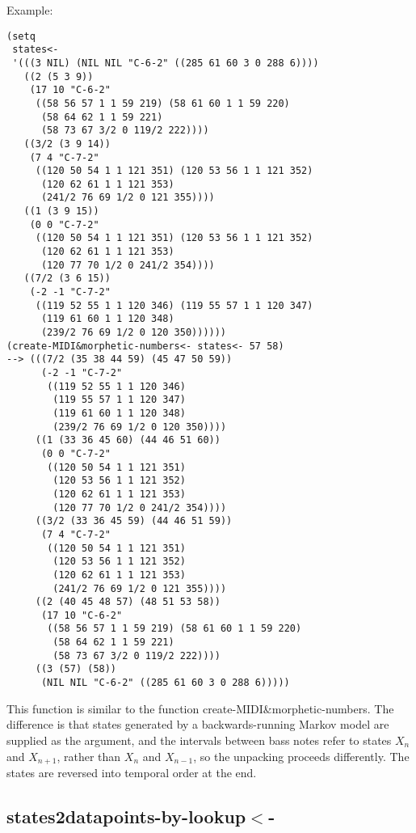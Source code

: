 \vspace{0.5cm}
\noindent Example:
\begin{verbatim}
(setq
 states<-
 '(((3 NIL) (NIL NIL "C-6-2" ((285 61 60 3 0 288 6))))
   ((2 (5 3 9))
    (17 10 "C-6-2"
     ((58 56 57 1 1 59 219) (58 61 60 1 1 59 220)
      (58 64 62 1 1 59 221)
      (58 73 67 3/2 0 119/2 222))))
   ((3/2 (3 9 14))
    (7 4 "C-7-2"
     ((120 50 54 1 1 121 351) (120 53 56 1 1 121 352)
      (120 62 61 1 1 121 353)
      (241/2 76 69 1/2 0 121 355))))
   ((1 (3 9 15))
    (0 0 "C-7-2"
     ((120 50 54 1 1 121 351) (120 53 56 1 1 121 352)
      (120 62 61 1 1 121 353)
      (120 77 70 1/2 0 241/2 354))))
   ((7/2 (3 6 15))
    (-2 -1 "C-7-2"
     ((119 52 55 1 1 120 346) (119 55 57 1 1 120 347)
      (119 61 60 1 1 120 348)
      (239/2 76 69 1/2 0 120 350))))))
(create-MIDI&morphetic-numbers<- states<- 57 58)
--> (((7/2 (35 38 44 59) (45 47 50 59))
      (-2 -1 "C-7-2"
       ((119 52 55 1 1 120 346)
        (119 55 57 1 1 120 347)
        (119 61 60 1 1 120 348)
        (239/2 76 69 1/2 0 120 350))))
     ((1 (33 36 45 60) (44 46 51 60))
      (0 0 "C-7-2"
       ((120 50 54 1 1 121 351)
        (120 53 56 1 1 121 352)
        (120 62 61 1 1 121 353)
        (120 77 70 1/2 0 241/2 354))))
     ((3/2 (33 36 45 59) (44 46 51 59))
      (7 4 "C-7-2"
       ((120 50 54 1 1 121 351)
        (120 53 56 1 1 121 352)
        (120 62 61 1 1 121 353)
        (241/2 76 69 1/2 0 121 355))))
     ((2 (40 45 48 57) (48 51 53 58))
      (17 10 "C-6-2"
       ((58 56 57 1 1 59 219) (58 61 60 1 1 59 220)
        (58 64 62 1 1 59 221)
        (58 73 67 3/2 0 119/2 222))))
     ((3 (57) (58))
      (NIL NIL "C-6-2" ((285 61 60 3 0 288 6)))))
\end{verbatim}

\noindent This function is similar to the function
create-MIDI\&morphetic-numbers. The difference is that
states generated by a backwards-running Markov model
are supplied as the argument, and the intervals
between bass notes refer to states $X_n$ and
$X_{n+1}$, rather than $X_n$ and $X_{n-1}$, so the
unpacking proceeds differently. The states are
reversed into temporal order at the end.


\subsection*{states2datapoints-by-lookup$<$-}\label{fun:states2datapoints-by-lookup<-}

